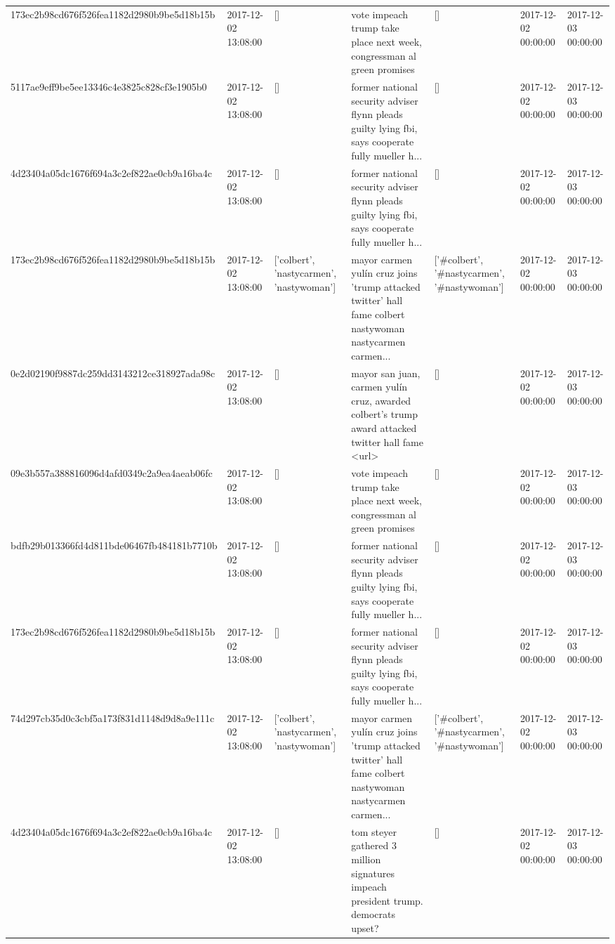 \begin{tabular}{lllllll}
173ec2b98cd676f526fea1182d2980b9be5d18b15b & 2017-12-02 13:08:00 & [] & vote impeach trump take place next week, congressman al green promises & [] & 2017-12-02 00:00:00 & 2017-12-03 00:00:00 \\
5117ae9eff9be5ee13346c4e3825c828cf3e1905b0 & 2017-12-02 13:08:00 & [] & former national security adviser flynn pleads guilty lying fbi, says cooperate fully mueller h... & [] & 2017-12-02 00:00:00 & 2017-12-03 00:00:00 \\
4d23404a05dc1676f694a3c2ef822ae0cb9a16ba4c & 2017-12-02 13:08:00 & [] & former national security adviser flynn pleads guilty lying fbi, says cooperate fully mueller h... & [] & 2017-12-02 00:00:00 & 2017-12-03 00:00:00 \\
173ec2b98cd676f526fea1182d2980b9be5d18b15b & 2017-12-02 13:08:00 & ['colbert', 'nastycarmen', 'nastywoman'] & mayor carmen yulín cruz joins 'trump attacked twitter' hall fame colbert nastywoman nastycarmen carmen... & ['#colbert', '#nastycarmen', '#nastywoman'] & 2017-12-02 00:00:00 & 2017-12-03 00:00:00 \\
0e2d02190f9887dc259dd3143212ce318927ada98c & 2017-12-02 13:08:00 & [] & mayor san juan, carmen yulín cruz, awarded colbert's trump award attacked twitter hall fame <url> & [] & 2017-12-02 00:00:00 & 2017-12-03 00:00:00 \\
09e3b557a388816096d4afd0349c2a9ea4aeab06fc & 2017-12-02 13:08:00 & [] & vote impeach trump take place next week, congressman al green promises & [] & 2017-12-02 00:00:00 & 2017-12-03 00:00:00 \\
bdfb29b013366fd4d811bde06467fb484181b7710b & 2017-12-02 13:08:00 & [] & former national security adviser flynn pleads guilty lying fbi, says cooperate fully mueller h... & [] & 2017-12-02 00:00:00 & 2017-12-03 00:00:00 \\
173ec2b98cd676f526fea1182d2980b9be5d18b15b & 2017-12-02 13:08:00 & [] & former national security adviser flynn pleads guilty lying fbi, says cooperate fully mueller h... & [] & 2017-12-02 00:00:00 & 2017-12-03 00:00:00 \\
74d297cb35d0c3cbf5a173f831d1148d9d8a9e111c & 2017-12-02 13:08:00 & ['colbert', 'nastycarmen', 'nastywoman'] & mayor carmen yulín cruz joins 'trump attacked twitter' hall fame colbert nastywoman nastycarmen carmen... & ['#colbert', '#nastycarmen', '#nastywoman'] & 2017-12-02 00:00:00 & 2017-12-03 00:00:00 \\
4d23404a05dc1676f694a3c2ef822ae0cb9a16ba4c & 2017-12-02 13:08:00 & [] & tom steyer gathered 3 million signatures impeach president trump. democrats upset? & [] & 2017-12-02 00:00:00 & 2017-12-03 00:00:00 \\

\end{tabular}
